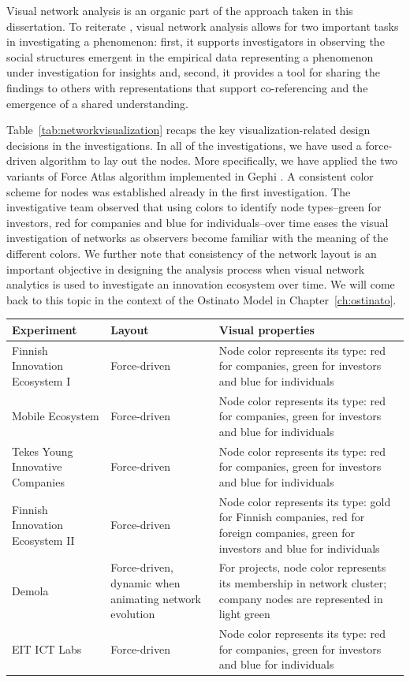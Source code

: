 Visual network analysis is an organic part of the approach taken in this dissertation. To reiterate \cite{Freeman2000VisualizingNetworks}, visual network analysis allows for two important tasks in investigating a phenomenon:  first, it supports investigators in observing the social structures emergent in the empirical data representing a phenomenon under investigation for insights and, second, it provides a tool for sharing the findings to others with representations that support co-referencing and the emergence of a shared understanding.

Table~\ref{tab:networkvisualization} recaps the key visualization-related design decisions in the investigations. In all of the investigations, we have used a force-driven algorithm to lay out the nodes. More specifically, we have applied the two variants of Force Atlas algorithm implemented in Gephi \citep{Bastian2009Gephi:Networks}. A consistent color scheme for nodes was established already in the first investigation. The investigative team observed that using colors to identify node types--green for investors, red for companies and blue for individuals--over time eases the visual investigation of networks as observers become familiar with the meaning of the different colors. We further note that consistency of the network layout is an important objective in designing the analysis process when visual network analytics is used to investigate an innovation ecosystem over time. We will come back to this topic in the context of the Ostinato Model in Chapter~\ref{ch:ostinato}.

\begingroup
{}\label{tab:networkvisualization}
\begin{tabular}{p{3cm} p{3cm} p{6cm}}
\toprule
Experiment & Layout & Visual properties \\
\midrule
Finnish Innovation Ecosystem I & 
Force-driven & 
Node color represents its type: red for companies, green for investors and blue for individuals  \\
Mobile Ecosystem &
Force-driven &
Node color represents its type: red for companies, green for investors and blue for individuals  \\
Tekes Young Innovative Companies &
Force-driven &
Node color represents its type: red for companies, green for investors and blue for individuals  \\
Finnish Innovation Ecosystem II  &
Force-driven &
Node color represents its type: gold for Finnish companies, red for foreign companies, green for investors and blue for individuals  \\
Demola &
Force-driven, dynamic when animating network evolution &
For projects, node color represents its membership in network cluster; company nodes are represented in light green \\
EIT ICT Labs &
Force-driven &
Node color represents its type: red for companies, green for investors and blue for individuals  \\
\bottomrule
\end{tabular}
\endgroup


